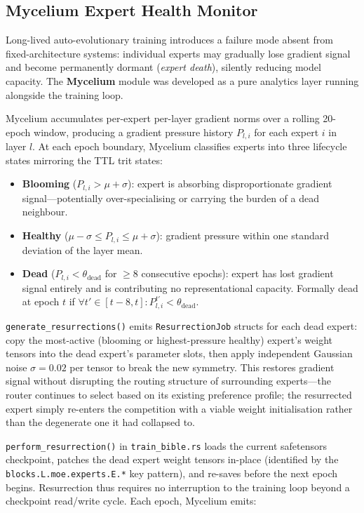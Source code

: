 \documentclass[journal,10pt,twocolumn]{IEEEtran}
\begin{document}
\subsection{Mycelium Expert Health Monitor}
\label{subsec:mycelium}

Long-lived auto-evolutionary training introduces a failure mode absent from
fixed-architecture systems: individual experts may gradually lose gradient
signal and become permanently dormant (\emph{expert death}), silently reducing
model capacity. The \textbf{Mycelium} module was developed as a pure analytics
layer running alongside the training loop.

Mycelium accumulates per-expert per-layer gradient norms over a rolling
20-epoch window, producing a gradient pressure history $P_{l,i}$ for each
expert $i$ in layer $l$. At each epoch boundary, Mycelium classifies experts
into three lifecycle states mirroring the TTL trit states:

\begin{itemize}
  \item \textbf{Blooming} ($P_{l,i} > \mu + \sigma$): expert is absorbing
        disproportionate gradient signal---potentially over-specialising or
        carrying the burden of a dead neighbour.
  \item \textbf{Healthy} ($\mu - \sigma \leq P_{l,i} \leq \mu + \sigma$):
        gradient pressure within one standard deviation of the layer mean.
  \item \textbf{Dead} ($P_{l,i} < \theta_\text{dead}$ for $\geq 8$
        consecutive epochs): expert has lost gradient signal entirely and is
        contributing no representational capacity. Formally dead at epoch $t$
        if $\forall t' \in [t-8, t]: P_{l,i}^{t'} < \theta_\text{dead}$.
\end{itemize}

\texttt{generate\_resurrections()} emits \texttt{ResurrectionJob} structs
for each dead expert: copy the most-active (blooming or highest-pressure
healthy) expert's weight tensors into the dead expert's parameter slots,
then apply independent Gaussian noise $\sigma = 0.02$ per tensor to break
the new symmetry. This restores gradient signal without disrupting the
routing structure of surrounding experts---the router continues to select
based on its existing preference profile; the resurrected expert simply
re-enters the competition with a viable weight initialisation rather than
the degenerate one it had collapsed to.

\texttt{perform\_resurrection()} in \texttt{train\_bible.rs} loads the
current safetensors checkpoint, patches the dead expert weight tensors
in-place (identified by the \texttt{blocks.L.moe.experts.E.*} key pattern),
and re-saves before the next epoch begins. Resurrection thus requires no
interruption to the training loop beyond a checkpoint read/write cycle.
Each epoch, Mycelium emits:
\end{document}
